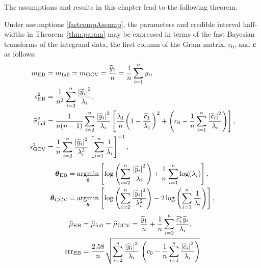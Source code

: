 \documentclass{svjour3}                     %
\newcommand{\bm}[1]{\boldsymbol{#1}}
\newcommand{\vtheta}{{\bm{\theta}}}
\newcommand{\vc}{\bm{c}}
\newcommand{\hmu}{\widehat{\mu}}
\newcommand{\MLE}{\textup{EB}}
\newcommand{\full}{\textup{full}}
\newcommand{\GCV}{\textup{GCV}}
\newcommand{\err}{\textup{err}}
\def\abs#1{\ensuremath{\left \lvert #1 \right \rvert}}
\providecommand{\argmin}{\operatorname*{argmin}}
\begin{document}
The assumptions and results in this chapter lead to the following theorem.

\begin{theorem} \label{thm:fastparam}
	Under assumptions \eqref{fastcompAssump}, the parameters and credible interval half-widths in Theorem~\ref{thm:param} may be expressed in terms of the fast Bayesian transforms of the integrand data, the first column of the Gram matrix, $c_0$, and $\vc$ as follows:
	\begin{align}
	\nonumber
	m_\MLE &=  m_{\full} = m_{\GCV} =  \frac{\widetilde{y}_1}{n} = \frac 1n \sum_{i=1}^n y_i,
	\\
	\nonumber
	s^2_\MLE 
	& =
	\frac{1}{n^2} 
	\sum_{i=2}^n \frac{\abs{\widetilde{y}_i}^2}{\lambda_i}, \\
	\nonumber
	\widehat{\sigma}^2_{\textup{full}}
	& =
	\frac{1}{n(n-1)} \sum_{i=2}^n \frac{\abs{\widetilde{y}_i}^2}{\lambda_i}
	\left[\frac{\lambda_1}{n}{\left(1 - \frac{\widetilde{c}_1}{\lambda_1}\right)^2} + \left(c_0  - \frac 1n \sum_{i=1}^n \frac{\abs{\widetilde{c}_i}^2}{\lambda_i}\right) \right], \\
	\nonumber 
	s^2_{\textup{GCV}} & =  \frac 1{n} \sum_{i=2}^n \frac{\abs{\widetilde{y}_i}^2}{\lambda_i^2}  \left [ \sum_{i=1}^n \frac{1}{\lambda_i} \right]^{-1},
	\end{align}
	\begin{subequations}
		\label{fastTheta}
		\begin{align}
		\label{eqn_MLE_loss_func_optimized_2}
		\vtheta_\MLE
		&= 
		\argmin_{\vtheta}
		\left[
		\log\left(
		\sum_{i=2}^n \frac{\abs{\widetilde{y}_i}^2}{\lambda_{i}}
		\right) 
		+ \frac{1}{n}\sum_{i=1}^n \log(\lambda_{i})
		\right],\\
		\label{thetaGCV} 
		\vtheta_{\GCV} 
		&= \argmin_\vtheta \left[ \log \left ( \sum_{i=2}^n \frac{\abs{\widetilde{y}_i}^2}{\lambda_{i}^2} 
		\right)  
		-2\log\left( \sum_{i=1}^n \frac{1}{\lambda_{i}} \right)
		\right], 
		\end{align}
	\end{subequations}
	\begin{align}
	\nonumber
	\hmu_\MLE  &= \hmu_{\full} = \hmu_{\GCV} =
	\frac{\widetilde{y}_1}{n} +
	\frac 1n \sum_{i=2}^n \frac{ \widetilde{c}_i^* \widetilde{y}_i}{\lambda_i}, \\
	\nonumber
	\err_\MLE  &
	=
	\frac{2.58}{n}\sqrt{
		\sum_{i=2}^{n} \frac{\abs{\widetilde{y}_i}^2}{\lambda_i}  
		\,
		\left( c_0 - \frac 1n \sum_{i=1}^n \frac{\abs{\widetilde{c}_i}^2}{\lambda_i} \right) 
}
\end{align}
\end{theorem}
\end{document}
